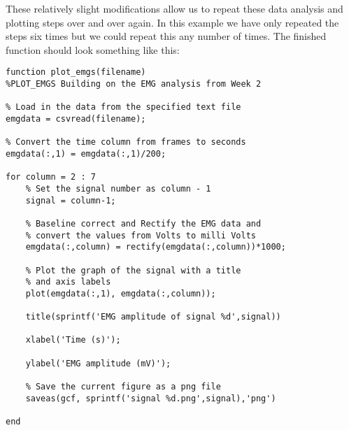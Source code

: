 \documentclass[12pt,a4paper]{article}
\begin{document}
These relatively slight modifications allow us to repeat these data analysis and plotting steps over and over again.  
In this example we have only repeated the steps six times but we could repeat this any number of times.  
The finished function should look something like this:

\begin{lstlisting}[style=Matlab-editor]
function plot_emgs(filename)
%PLOT_EMGS Building on the EMG analysis from Week 2

% Load in the data from the specified text file 
emgdata = csvread(filename);

% Convert the time column from frames to seconds
emgdata(:,1) = emgdata(:,1)/200;

for column = 2 : 7
    % Set the signal number as column - 1
    signal = column-1;

    % Baseline correct and Rectify the EMG data and 
    % convert the values from Volts to milli Volts
    emgdata(:,column) = rectify(emgdata(:,column))*1000;

    % Plot the graph of the signal with a title 
    % and axis labels	
    plot(emgdata(:,1), emgdata(:,column));
    
    title(sprintf('EMG amplitude of signal %d',signal))
    
    xlabel('Time (s)');
    
    ylabel('EMG amplitude (mV)');

    % Save the current figure as a png file
    saveas(gcf, sprintf('signal %d.png',signal),'png')

end
		
\end{lstlisting}

%
%
%
%
%
\end{document}
